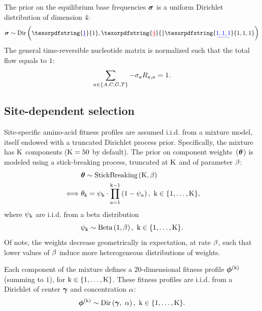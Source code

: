 \documentclass{article}
\providecommand{\DIFaddtex}[1]{{\protect\color{blue}\uwave{#1}}} %
\providecommand{\DIFdeltex}[1]{{\protect\color{red}\sout{#1}}}                      %
\providecommand{\DIFaddbegin}{} %
\providecommand{\DIFaddend}{} %
\providecommand{\DIFdelbegin}{} %
\providecommand{\DIFdelend}{} %
\providecommand{\DIFadd}[1]{\texorpdfstring{\DIFaddtex{#1}}{#1}} %
\providecommand{\DIFdel}[1]{\texorpdfstring{\DIFdeltex{#1}}{}} %
\begin{document}
    The {prior} on the equilibrium base frequencies $\bm{\sigma}$ is a uniform Dirichlet distribution of dimension $4$:
    \begin{equation}
        \label{eq:DistribMutequi}
        \Mutequi \sim \text{Dir}\left( \DIFdelbegin %
\DIFdelend \DIFaddbegin \DIFadd{1}\DIFaddend ,\DIFdelbegin \DIFdel{4}\DIFdelend \DIFaddbegin \DIFadd{1,1,1 }\DIFaddend \right)
    \end{equation}
    The general time-reversible nucleotide matrix is normalized such that the total flow equals to $1$:
    \begin{equation}
        \sum\limits_{a \in \{A, C, G, T\}} - \sigma_a R_{a,a} = 1.
    \end{equation}

    \subsection{Site-dependent selection}
    \label{sec:profiles}
    Site-specific amino-acid fitness profiles are assumed i.i.d. from a mixture model, itself endowed with a truncated Dirichlet process prior.
    Specifically, the mixture has $\text{K}$ components ($\text{K} = 50$ by default).
    The prior on component weights~($\bm{\theta}$) is modeled using a stick-breaking process, truncated at $\text{K}$ and of parameter $\beta$:
    \begin{align}
        \label{eq:DistribStickBreaking}
        \begin{split}
            & \bm{\theta} \sim \text{StickBreaking}\left( \text{K}, \beta \right)\\
            \iff & \theta_{\text{k}} = \psi_{\text{k}}\cdot \prod _{{a=1}}^{{\text{k}-1}}\left(1-\psi_{a}\right),\ \text{k} \in \{1, \hdots, \text{K}\},
        \end{split}
    \end{align}
    where $\psi_{\text{k}}$ are i.i.d. from a beta distribution
    \begin{equation}
        \label{eq:Beta}
        \psi_{\text{k}} \sim \text{Beta}\left( 1, \beta \right),\ \text{k} \in \{1, \hdots, \text{K}\}.
    \end{equation}
    Of note, the weights decrease geometrically in expectation, at rate $\beta$, such that lower values of $\beta$ induce more heterogeneous distributions of weights.

    Each component of the mixture defines a 20-dimensional fitness profile $\bm{\phi}^{(\text{k})}$ (summing to $1$), for $ \text{k} \in \{1, \hdots, \text{K}\}$.
    These fitness profiles are i.i.d. from a Dirichlet of center $\bm{\gamma}$ and concentration $\alpha$:
    \begin{equation}
        \label{eq:DistribBase}
        \bm{\phi}^{(\text{k})} \sim \text{Dir}\left( \bm{\gamma},\ \alpha \right),\ \text{k} \in \{1, \hdots, \text{K}\}.
    \end{equation}
\end{document}
